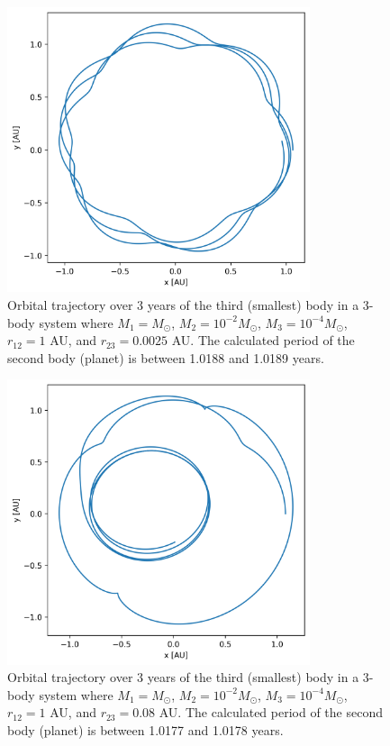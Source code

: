 \documentclass{article}
\begin{document}
\begin{figure}[!h]
    \centering
    \includegraphics[width=3.5in]{homework4/1-2.png}
    \caption{Orbital trajectory over 3 years of the third (smallest) body in a 3-body system where $M_1=M_\odot$, $M_2=10^{-2}M_\odot$, $M_3 = 10^{-4}M_\odot$, $r_{12}=1$ AU, and $r_{23}= 0.0025$ AU. The calculated period of the second body (planet) is between 1.0188 and 1.0189 years.}
    \label{fig:1-2}
\end{figure}

\begin{figure}[!h]
    \centering
    \includegraphics[width=3.5in]{homework4/1-3.png}
    \caption{Orbital trajectory over 3 years of the third (smallest) body in a 3-body system where $M_1=M_\odot$, $M_2=10^{-2}M_\odot$, $M_3 = 10^{-4}M_\odot$, $r_{12}=1$ AU, and $r_{23}= 0.08$ AU. The calculated period of the second body (planet) is between 1.0177 and 1.0178 years.}
    \label{fig:1-3}
\end{figure}
\end{document}
